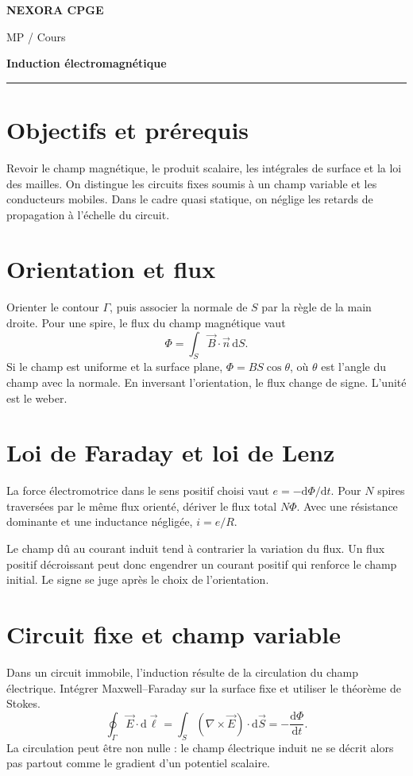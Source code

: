 \documentclass[11pt,a4paper]{article}
\begin{document}
\makeatletter
\def\@oddfoot{\footnotesize Download for free at \url{https://openstax.org/details/books/university-physics-volume-2}.\hfil\thepage}
\let\@evenfoot\@oddfoot
\makeatother
{\small\bfseries\color{nexorablue} NEXORA CPGE}\par
{\small MP / Cours}\par
{\LARGE\bfseries Induction électromagnétique}\par
\vspace{0.25em}\hrule\vspace{0.6em}

\section*{Objectifs et prérequis}
Revoir le champ magnétique, le produit scalaire, les intégrales de surface et la loi des mailles. On distingue les circuits fixes soumis à un champ variable et les conducteurs mobiles. Dans le cadre quasi statique, on néglige les retards de propagation à l’échelle du circuit.

\section*{Orientation et flux}
Orienter le contour $\Gamma$, puis associer la normale de $S$ par la règle de la main droite. Pour une spire, le flux du champ magnétique vaut
\[ \Phi=\int_S \vec B\cdot\vec n\,\mathrm dS. \]
Si le champ est uniforme et la surface plane, $\Phi=BS\cos\theta$, où $\theta$ est l’angle du champ avec la normale. En inversant l’orientation, le flux change de signe. L’unité est le weber.

\section*{Loi de Faraday et loi de Lenz}
La force électromotrice dans le sens positif choisi vaut $e=-\mathrm d\Phi/\mathrm dt$. Pour $N$ spires traversées par le même flux orienté, dériver le flux total $N\Phi$. Avec une résistance dominante et une inductance négligée, $i=e/R$.

Le champ dû au courant induit tend à contrarier la variation du flux. Un flux positif décroissant peut donc engendrer un courant positif qui renforce le champ initial. Le signe se juge après le choix de l’orientation.

\section*{Circuit fixe et champ variable}
Dans un circuit immobile, l’induction résulte de la circulation du champ électrique. Intégrer Maxwell–Faraday sur la surface fixe et utiliser le théorème de Stokes.
\[ \oint_\Gamma\vec E\cdot\mathrm d\vec\ell=\int_S(\nabla\times\vec E)\cdot\mathrm d\vec S=-\frac{\mathrm d\Phi}{\mathrm dt}. \]
La circulation peut être non nulle : le champ électrique induit ne se décrit alors pas partout comme le gradient d’un potentiel scalaire.
\end{document}

